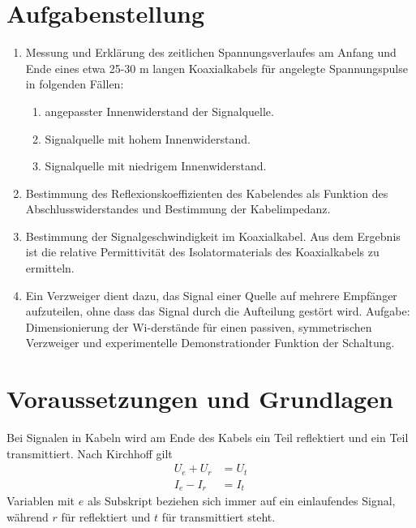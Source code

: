 \documentclass{article}
\begin{document}
\parindent0cm




\pagestyle{fancy}

\tableofcontents
\newpage
\section{Aufgabenstellung}

\begin{enumerate}
\item Messung und Erklärung des zeitlichen Spannungsverlaufes am Anfang und Ende eines etwa 25-30 m langen Koaxialkabels für angelegte Spannungspulse in folgenden Fällen:
\begin{enumerate}
\item angepasster Innenwiderstand der Signalquelle.
\item Signalquelle mit hohem Innenwiderstand.
\item Signalquelle mit niedrigem Innenwiderstand.
\end{enumerate}
\item Bestimmung des Reflexionskoeffizienten des Kabelendes als Funktion des Abschlusswiderstandes und Bestimmung der Kabelimpedanz.
\item Bestimmung der Signalgeschwindigkeit im Koaxialkabel. Aus dem Ergebnis ist die relative Permittivität des Isolatormaterials des Koaxialkabels zu ermitteln.
\item Ein Verzweiger dient dazu, das Signal einer Quelle auf mehrere Empfänger aufzuteilen, ohne dass das Signal durch die Aufteilung gestört wird. Aufgabe: Dimensionierung der Wi-derstände für einen passiven, symmetrischen Verzweiger und experimentelle Demonstrationder Funktion der Schaltung.
 
\end{enumerate}



\section{Voraussetzungen und Grundlagen}

Bei Signalen in Kabeln wird am Ende des Kabels ein Teil reflektiert und ein Teil transmittiert. Nach Kirchhoff gilt
\begin{align}
U_e + U_r &= U_t \\
I_e - I_r &= I_t
\end{align}
Variablen mit $e$ als Subskript beziehen sich immer auf ein einlaufendes Signal, während $r$ für reflektiert und $t$ für transmittiert steht.
\end{document}
